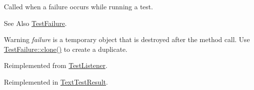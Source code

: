 Called when a failure occurs while running a test. 

\begin{DoxySeeAlso}{See Also}
\hyperlink{class_test_failure}{Test\-Failure}. 
\end{DoxySeeAlso}
\begin{DoxyWarning}{Warning}
{\itshape failure} is a temporary object that is destroyed after the method call. Use \hyperlink{class_test_failure_a0f0c86f12431ea8adde3e70e0cb52db7}{Test\-Failure\-::clone()} to create a duplicate. 
\end{DoxyWarning}


Reimplemented from \hyperlink{class_test_listener_a103216a5814c907f7b752b969477e765}{Test\-Listener}.



Reimplemented in \hyperlink{class_text_test_result_a05d3b0e8e51b3430092166bbc3d17708}{Text\-Test\-Result}.

